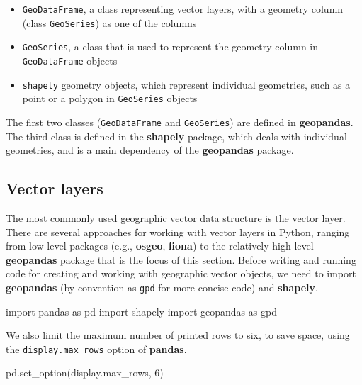 \documentclass[
  letterpaper,
]{krantz}
\newenvironment{Shaded}{\begin{snugshade}}{\end{snugshade}}
\newcommand{\DecValTok}[1]{\textcolor[rgb]{0.68,0.00,0.00}{#1}}
\newcommand{\ImportTok}[1]{\textcolor[rgb]{0.00,0.46,0.62}{#1}}
\newcommand{\NormalTok}[1]{\textcolor[rgb]{0.00,0.23,0.31}{#1}}
\newcommand{\StringTok}[1]{\textcolor[rgb]{0.13,0.47,0.30}{#1}}
\providecommand{\tightlist}{%
  \setlength{\itemsep}{0pt}\setlength{\parskip}{0pt}}\usepackage{longtable,booktabs,array}
\begin{document}
\begin{itemize}
\tightlist
\item
  \texttt{GeoDataFrame}, a class representing vector layers, with a
  geometry column (class \texttt{GeoSeries}) as one of the columns
\item
  \texttt{GeoSeries}, a class that is used to represent the geometry
  column in \texttt{GeoDataFrame} objects
\item
  \texttt{shapely} geometry objects, which represent individual
  geometries, such as a point or a polygon in \texttt{GeoSeries} objects
\end{itemize}

The first two classes (\texttt{GeoDataFrame} and \texttt{GeoSeries}) are
defined in \textbf{geopandas}. The third class is defined in the
\textbf{shapely} package, which deals with individual geometries, and is
a main dependency of the \textbf{geopandas} package.

\subsection{Vector layers}\label{sec-vector-layers}

The most commonly used geographic vector data structure is the vector
layer. There are several approaches for working with vector layers in
Python, ranging from low-level packages (e.g., \textbf{osgeo},
\textbf{fiona}) to the relatively high-level \textbf{geopandas} package
that is the focus of this section. Before writing and running code for
creating and working with geographic vector objects, we need to import
\textbf{geopandas} (by convention as \texttt{gpd} for more concise code)
and \textbf{shapely}.

\begin{Shaded}
\begin{Highlighting}[]
\ImportTok{import}\NormalTok{ pandas }\ImportTok{as}\NormalTok{ pd}
\ImportTok{import}\NormalTok{ shapely}
\ImportTok{import}\NormalTok{ geopandas }\ImportTok{as}\NormalTok{ gpd}
\end{Highlighting}
\end{Shaded}

We also limit the maximum number of printed rows to six, to save space,
using the \texttt{\textquotesingle{}display.max\_rows\textquotesingle{}}
option of \textbf{pandas}.

\begin{Shaded}
\begin{Highlighting}[]
\NormalTok{pd.set\_option(}\StringTok{\textquotesingle{}display.max\_rows\textquotesingle{}}\NormalTok{, }\DecValTok{6}\NormalTok{)}
\end{Highlighting}
\end{Shaded}
\end{document}
